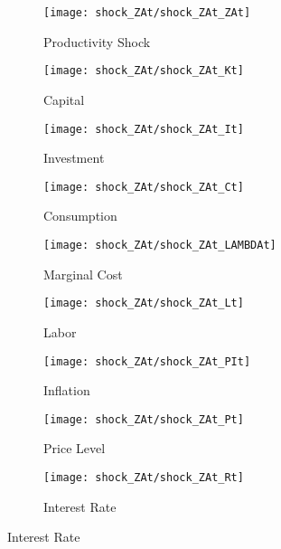 \documentclass[
thesis.tex
]{subfiles}
\begin{document}
	\begin{figure}[h!]
		\centering
		\begin{subfigure}[b]{0.3\textwidth}
			\centering
			\texttt{[image: shock\_ZAt/shock\_ZAt\_ZAt]}
			\caption{Productivity Shock}
			\label{fig:zat-productivity-shock}
		\end{subfigure}
		\hfill
		\begin{subfigure}[b]{0.3\textwidth}
			\centering
			\texttt{[image: shock\_ZAt/shock\_ZAt\_Kt]}
			\caption{Capital}
			\label{fig:zat-capital}
		\end{subfigure}
		\hfill
		\begin{subfigure}[b]{0.3\textwidth}
			\centering
			\texttt{[image: shock\_ZAt/shock\_ZAt\_It]}
			\caption{Investment}
			\label{fig:zat-investment}
		\end{subfigure}
		\hfill
		
		\vspace*{0.5cm}
		
		\begin{subfigure}[b]{0.3\textwidth}
			\centering
			\texttt{[image: shock\_ZAt/shock\_ZAt\_Ct]}
			\caption{Consumption}
			\label{fig:zat-consumption}
		\end{subfigure}
		\hfill
		\begin{subfigure}[b]{0.3\textwidth}
			\centering
			\texttt{[image: shock\_ZAt/shock\_ZAt\_LAMBDAt]}
			\caption{Marginal Cost}
			\label{fig:zat-marginal-cost}
		\end{subfigure}
		\hfill
		\begin{subfigure}[b]{0.3\textwidth}
			\centering
			\texttt{[image: shock\_ZAt/shock\_ZAt\_Lt]}
			\caption{Labor}
			\label{fig:zat-labor}
		\end{subfigure}
		\hfill
		
		\vspace*{0.5cm}
		
		\begin{subfigure}[b]{0.3\textwidth}
			\centering
			\texttt{[image: shock\_ZAt/shock\_ZAt\_PIt]}
			\caption{Inflation}
			\label{fig:zat-inflation}
		\end{subfigure}
		\hfill
		\begin{subfigure}[b]{0.3\textwidth}
			\centering
			\texttt{[image: shock\_ZAt/shock\_ZAt\_Pt]}
			\caption{Price Level}
			\label{fig:zat-price}
		\end{subfigure}
		\hfill
		\begin{subfigure}[b]{0.3\textwidth}
			\centering
			\texttt{[image: shock\_ZAt/shock\_ZAt\_Rt]}
			\caption{Interest Rate}
			\label{fig:zat-interest-rate}
		\end{subfigure}
		\hfill
		

\end{figure}
\end{document}

